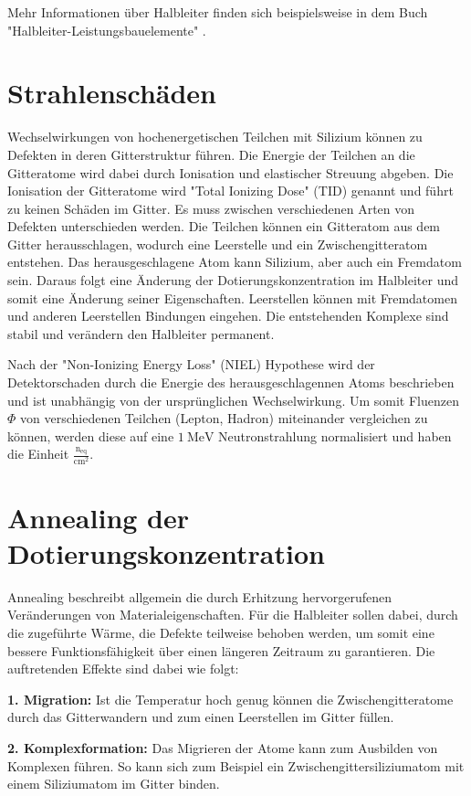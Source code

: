 Mehr Informationen über Halbleiter finden sich beispielsweise in dem Buch "Halbleiter-Leistungsbauelemente"  \cite{semiconductor}.

\section{Strahlenschäden}
Wechselwirkungen von hochenergetischen Teilchen mit Silizium können zu Defekten in deren
Gitterstruktur führen.
Die Energie der Teilchen an die Gitteratome wird dabei durch Ionisation und elastischer Streuung abgeben. Die Ionisation der
Gitteratome wird "Total Ionizing Dose" (TID) genannt und führt zu keinen Schäden im Gitter.
Es muss zwischen verschiedenen Arten von Defekten unterschieden werden. Die Teilchen können ein Gitteratom aus dem
Gitter herausschlagen, wodurch eine Leerstelle und ein Zwischengitteratom entstehen. Das herausgeschlagene Atom
kann Silizium, aber auch ein Fremdatom sein. Daraus folgt eine Änderung der Dotierungskonzentration im
Halbleiter und somit eine Änderung seiner Eigenschaften.
Leerstellen können mit Fremdatomen und anderen Leerstellen Bindungen eingehen. Die
entstehenden Komplexe sind stabil und verändern den Halbleiter permanent.

Nach der "Non-Ionizing Energy Loss" (NIEL) Hypothese wird der Detektorschaden durch die Energie des herausgeschlagennen
Atoms beschrieben und ist unabhängig von der ursprünglichen Wechselwirkung.
Um somit Fluenzen $ \Phi$ von verschiedenen Teilchen (Lepton, Hadron) miteinander vergleichen zu können, werden diese
auf eine $\SI{1}{\mega\eV}$ Neutronstrahlung normalisiert und haben die Einheit $\mathrm{\frac{n_{\mathrm{eq}}}{cm^2}}$.


\section{Annealing der Dotierungskonzentration}
Annealing beschreibt allgemein die durch Erhitzung hervorgerufenen Veränderungen von Materialeigenschaften. Für die
Halbleiter sollen dabei, durch die zugeführte Wärme, die Defekte teilweise behoben werden, um somit eine
bessere Funktionsfähigkeit über einen längeren Zeitraum zu garantieren. Die auftretenden Effekte sind dabei wie folgt:

\textbf{1. Migration:} Ist die Temperatur hoch genug können die Zwischengitteratome durch das Gitterwandern und
zum einen Leerstellen im Gitter füllen.

\textbf{2. Komplexformation:} Das Migrieren der Atome kann zum Ausbilden von Komplexen führen. So kann sich zum Beispiel ein
Zwischengittersiliziumatom mit einem Siliziumatom im Gitter binden.

